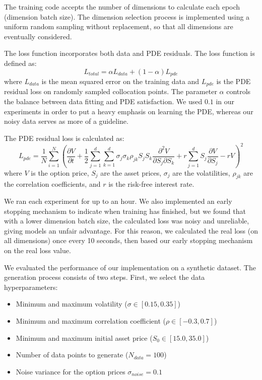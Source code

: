 \documentclass[manuscript,screen,review,acmtog]{acmart}
\begin{document}
The training code accepts the number of dimensions to calculate each epoch (dimension batch size). The dimension selection process is implemented using a uniform random sampling without replacement, so that all dimensions are eventually considered.

The loss function incorporates both data and PDE residuals. The loss function is defined as:
\begin{equation}
    L_{total} = \alpha L_{data} + (1-\alpha)L_{pde}
\end{equation}
where $L_{data}$ is the mean squared error on the training data and $L_{pde}$ is the PDE residual loss on randomly sampled collocation points.
The parameter $\alpha$ controls the balance between data fitting and PDE satisfaction. We used $0.1$ in our experiments in order to put a heavy emphasis on learning the PDE, whereas our noisy data serves as more of a guideline.

The PDE residual loss is calculated as:
\begin{equation}
    L_{pde} = \frac{1}{N} \sum_{i=1}^N \left(\frac{\partial V}{\partial t} + \frac{1}{2}\sum_{j=1}^d \sum_{k=1}^d \sigma_j \sigma_k \rho_{jk} S_j S_k \frac{\partial^2 V}{\partial S_j \partial S_k} + r\sum_{j=1}^d S_j \frac{\partial V}{\partial S_j} - rV\right)^2
\end{equation}
where $V$ is the option price, $S_j$ are the asset prices, $\sigma_j$ are the volatilities, $\rho_{jk}$ are the correlation coefficients, and $r$ is the risk-free interest rate.

We ran each experiment for up to an hour. We also implemented an early stopping mechanism to indicate when training has finished, but we found that with a lower dimension batch size, the calculated loss was noisy and unreliable, giving models an unfair advantage. For this reason, we calculated the real loss (on all dimensions) once every 10 seconds, then based our early stopping mechanism on the real loss value.

We evaluated the performance of our implementation on a synthetic dataset.
The generation process consists of two steps. First, we select the data hyperparameters:
\begin{itemize}
    \item Minimum and maximum volatility ($\sigma \in [0.15, 0.35]$)
    \item Minimum and maximum correlation coefficient ($\rho \in [-0.3, 0.7]$)
    \item Minimum and maximum initial asset price ($S_0 \in [15.0, 35.0]$)
    \item Number of data points to generate ($N_{data} = 100$)
    \item Noise variance for the option prices $\sigma_{noise} = 0.1$
\end{itemize}
\end{document}
